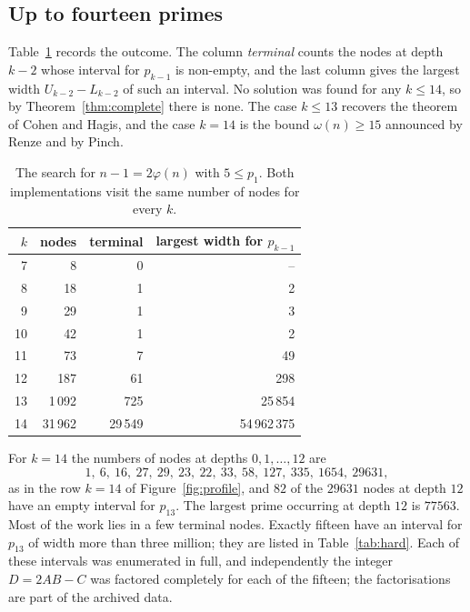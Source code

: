 \documentclass[screen,reqno]{aomart}
\numberwithin{equation}{section}
\theoremstyle{plain}
\theoremstyle{definition}
\theoremstyle{remark}
\begin{document}
\subsection{Up to fourteen primes}

Table~\ref{tab:first} records the outcome. The column \emph{terminal}
counts the nodes at depth $k-2$ whose interval for $p_{k-1}$ is
non-empty, and the last column gives the largest width $U_{k-2}-L_{k-2}$
of such an interval. No solution was found for any $k\le14$, so by
Theorem~\ref{thm:complete} there is none. The case $k\le13$ recovers
the theorem of Cohen and Hagis, and the case $k=14$ is the bound
$\omega(n)\ge15$ announced by Renze and by Pinch.

\begin{table}[ht]
\centering
\caption{The search for $n-1=2\varphi(n)$ with $5\le p_1$. Both
implementations visit the same number of nodes for every $k$.}
\label{tab:first}
\smallskip
\begin{tabular}{@{}rrrr@{}}
\toprule
$k$ & nodes & terminal & largest width for $p_{k-1}$ \\
\midrule
 7 &      8 &      0 &            -- \\
 8 &     18 &      1 &             2 \\
 9 &     29 &      1 &             3 \\
10 &     42 &      1 &             2 \\
11 &     73 &      7 &            49 \\
12 &    187 &     61 &           298 \\
13 & 1\,092 &    725 &       25\,854 \\
14 & 31\,962 & 29\,549 & 54\,962\,375 \\
\bottomrule
\end{tabular}
\end{table}

For $k=14$ the numbers of nodes at depths $0,1,\dots,12$ are
\[
  1,\ 6,\ 16,\ 27,\ 29,\ 23,\ 22,\ 33,\ 58,\ 127,\ 335,\ 1654,\ 29631,
\]
as in the row $k=14$ of Figure~\ref{fig:profile}, and $82$ of the $29631$ nodes at depth $12$ have an empty interval for
$p_{13}$. The largest prime occurring at depth $12$ is $77563$. Most of
the work lies in a few terminal nodes. Exactly
fifteen have an interval for $p_{13}$ of width more than three million;
they are listed in Table~\ref{tab:hard}. Each of these intervals was
enumerated in full, and independently the integer $D=2AB-C$ was
factored completely for each of the fifteen; the factorisations are
part of the archived data.
\end{document}
